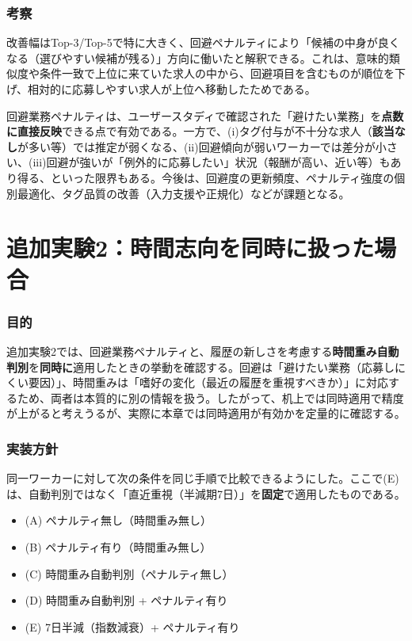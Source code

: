 \subsubsection*{考察}
改善幅はTop-3/Top-5で特に大きく、回避ペナルティにより「候補の中身が良くなる（選びやすい候補が残る）」方向に働いたと解釈できる。これは、意味的類似度や条件一致で上位に来ていた求人の中から、回避項目を含むものが順位を下げ、相対的に応募しやすい求人が上位へ移動したためである。

回避業務ペナルティは、ユーザースタディで確認された「避けたい業務」を\textbf{点数に直接反映}できる点で有効である。一方で、(i)タグ付与が不十分な求人（\textbf{該当なし}が多い等）では推定が弱くなる、(ii)回避傾向が弱いワーカーでは差分が小さい、(iii)回避が強いが「例外的に応募したい」状況（報酬が高い、近い等）もあり得る、といった限界もある。今後は、回避度の更新頻度、ペナルティ強度の個別最適化、タグ品質の改善（入力支援や正規化）などが課題となる。

\section{追加実験2：時間志向を同時に扱った場合}
\subsubsection*{目的}
追加実験2では、回避業務ペナルティと、履歴の新しさを考慮する\textbf{時間重み自動判別}を\textbf{同時に}適用したときの挙動を確認する。回避は「避けたい業務（応募しにくい要因）」、時間重みは「嗜好の変化（最近の履歴を重視すべきか）」に対応するため、両者は本質的に別の情報を扱う。したがって、机上では同時適用で精度が上がると考えうるが、実際に本章では同時適用が有効かを定量的に確認する。

\subsubsection*{実装方針}
同一ワーカーに対して次の条件を同じ手順で比較できるようにした。ここで(E)は、自動判別ではなく「直近重視（半減期7日）」を\textbf{固定}で適用したものである。
\begin{itemize}
\item (A) ペナルティ無し（時間重み無し）
\item (B) ペナルティ有り（時間重み無し）
\item (C) 時間重み自動判別（ペナルティ無し）
\item (D) 時間重み自動判別 + ペナルティ有り
\item (E) 7日半減（指数減衰）+ ペナルティ有り
\end{itemize}

